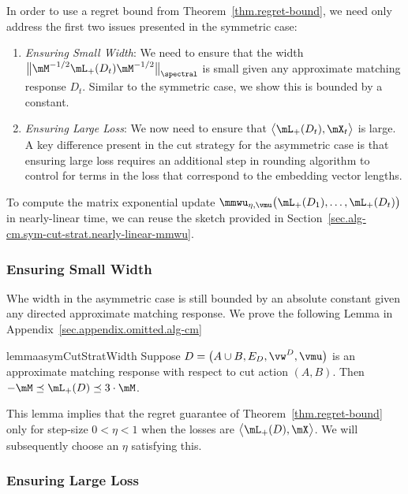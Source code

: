 \documentclass[letterpaper]{article}
\begin{document}
In order to use a regret bound from Theorem~\ref{thm.regret-bound}, we need only address the first two issues presented in the symmetric case:
\begin{enumerate}[(1)]
\item \emph{Ensuring Small Width}: We need to ensure that the width $\big\lVert \mM^{-1/2} \mL_{+}(D_t) \mM^{-1/2} \big\rVert_{\spectral}$ is small given any approximate matching response $D_t$. Similar to the symmetric case, we show this is bounded by a constant.

\item \emph{Ensuring Large Loss}: We now need to ensure that $\big\langle \mL_{+}(D_t), \mX_t \big\rangle$ is large. A key difference present in the cut strategy for the asymmetric case is that ensuring large loss requires an additional step in rounding algorithm to control for terms in the loss that correspond to the embedding vector lengths.
\end{enumerate}
To compute the matrix exponential update $\mmwu_{\eta, \vmu}\big( \mL_{+}(D_1), \ldots, \mL_{+}(D_t) \big)$ in nearly-linear time, we can reuse the sketch provided in Section~\ref{sec.alg-cm.sym-cut-strat.nearly-linear-mmwu}.


\subsubsection{Ensuring Small Width}

Whe width in the asymmetric case is still bounded by an absolute constant given any directed approximate matching response. We prove the following Lemma in Appendix~\ref{sec.appendix.omitted.alg-cm}

\begin{restatable}{lemma}{asymCutStratWidth}
\label{lem.asym-cut-strat.width}
Suppose $D = \big( A \cup B, E_D, \vw^D, \vmu \big)$ is an approximate matching response with respect to cut action $(A, B)$. Then $- \mM \preceq \mL_{+}(D) \preceq 3 \cdot \mM$.
\end{restatable}

\noindent
This lemma implies that the regret guarantee of Theorem~\ref{thm.regret-bound} only for step-size $0 < \eta < 1$ when the losses are $\big\langle \mL_{+}(D), \mX \big\rangle$. We will subsequently choose an $\eta$ satisfying this.


\subsubsection{Ensuring Large Loss}
\end{document}
